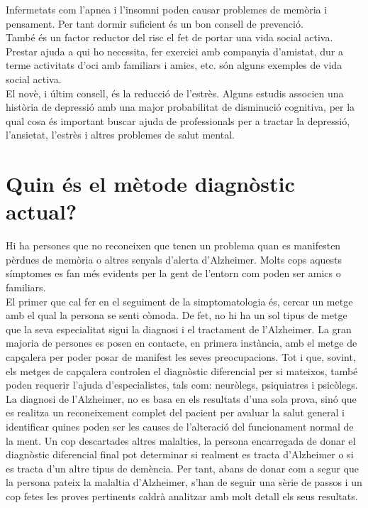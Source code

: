 \documentclass[a4paper,12pt]{report}
\begin{document}
Infermetats com l'apnea i l'insomni poden causar problemes de memòria i pensament. Per tant dormir suficient és un bon consell de prevenció.\\
També és un factor reductor del risc el fet de portar una vida social activa. Prestar ajuda a qui ho necessita, fer exercici amb companyia d'amistat, dur a terme activitats d'oci amb familiars i amics, etc. són alguns exemples de vida social activa.\\
El novè, i últim consell, és la reducció de l'estrès. Alguns estudis associen una història de depressió amb una major probabilitat de disminució cognitiva, per la qual cosa és important buscar ajuda de professionals per a tractar la depressió, l'ansietat, l'estrès i altres problemes de salut mental.
\section*{Quin és el mètode diagnòstic actual?}
Hi ha persones que no reconeixen que tenen un problema quan es manifesten pèrdues de memòria o altres senyals d'alerta d'Alzheimer. Molts cops aquests símptomes es fan més evidents per la gent de l'entorn com poden ser amics o familiars.\\
El primer que cal fer en el seguiment de la simptomatologia és, cercar un metge amb el qual la persona se senti còmoda. De fet, no hi ha un sol tipus de metge que la seva especialitat sigui la diagnosi i el tractament de l'Alzheimer. La gran majoria de persones es posen en contacte, en primera instància, amb el metge de capçalera per poder posar de manifest les seves preocupacions. Tot i que, sovint, els metges de capçalera controlen el diagnòstic diferencial per si mateixos, també poden requerir l'ajuda d'especialistes, tals com: neuròlegs, psiquiatres i psicòlegs.\\
La diagnosi de l'Alzheimer, no es basa en els resultats d'una sola prova, sinó que es realitza un reconeixement complet del pacient per avaluar la salut general i identificar quines poden ser les causes de l'alteració del funcionament normal de la ment. Un cop descartades altres malalties, la persona encarregada de donar el diagnòstic diferencial final pot determinar si realment es tracta d'Alzheimer o si es tracta d'un altre tipus de demència. Per tant, abans de donar com a segur que la persona pateix la malaltia d'Alzheimer, s'han de seguir una sèrie de passos i un cop fetes les proves pertinents caldrà analitzar amb molt detall els seus resultats.\\
\end{document}
